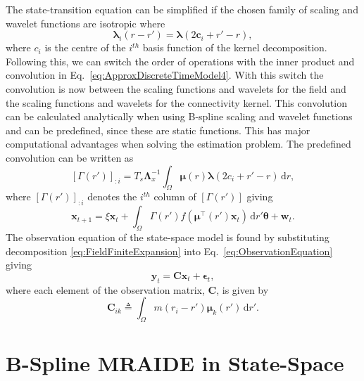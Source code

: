 \documentclass[review,authoryear,3p]{elsarticle}
\newcommand{\parham}[1]{\textcolor{blue}{#1}}
\begin{document}
The state-transition equation can be simplified if the chosen family of scaling and wavelet functions are isotropic where
\begin{equation}
	\boldsymbol{\lambda}_{i}(r-r') = \boldsymbol{\lambda}(2\mathbf{c}_{i}+r'-r), 
\end{equation}
where $c_i$ is the centre of the $i^{th}$ basis function of the kernel decomposition. Following this, we can switch the order of operations with the inner product and convolution in Eq.~\eqref{eq:ApproxDiscreteTimeModel4}. With this switch the convolution is now between the scaling functions and wavelets for the field and the scaling functions and wavelets for the connectivity kernel. This convolution can be calculated analytically when using B-spline scaling and wavelet functions and can be predefined, since these are static functions. This has major computational advantages when solving the estimation problem. %
The predefined convolution can be written as
\begin{equation}\label{eq:Gammaij}
	\left[\Gamma(r')\right]_{:i} = T_s \mathbf{\Lambda}_{x}^{-1}\int_{\Omega} \boldsymbol\mu\left(r\right)\boldsymbol\lambda\left(2c_{i} + r'-r\right) \,\mathrm{d}r,
\end{equation} 
 where $\left[\Gamma(r')\right]_{:i}$ denotes the $i^{th}$ column of  $\left[\Gamma(r')\right]$ giving
\begin{equation}
	\mathbf{x}_{t+1} = 
	\xi \mathbf{x}_t + 
	\int_{\Omega} \Gamma\left(r'\right)f\left(\boldsymbol\mu^\top\left(r'\right) \mathbf{x}_t\right) 
	\, \mathrm{d}r' \boldsymbol\theta
	+ \mathbf w_t.
\end{equation}
The observation equation of the state-space model is found by substituting decomposition \eqref{eq:FieldFiniteExpansion}
 into Eq.~\eqref{eq:ObservationEquation} giving
\begin{equation}\label{eq:ReducedObservationEquation} 
	\mathbf{y}_t = \mathbf{C}\mathbf{x}_t + \boldsymbol{\epsilon}_t,
\end{equation}
where each element of the observation matrix, $\mathbf{C}$, is given by
\begin{equation}\label{eq:Observationmatrix}
	\mathbf{C}_{ik} \triangleq \int_{\Omega}m(r_i -r')\boldsymbol{\mu}_k(r') \, \mathrm{d}r'.
\end{equation}
\section{B-Spline MRAIDE in State-Space }
\end{document}
